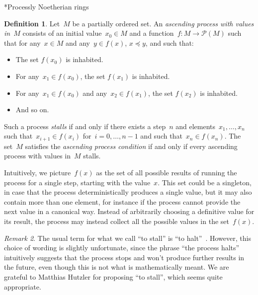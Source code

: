 \documentclass[10pt,reqno,a4paper]{amsbook}
\makeatletter
\theoremstyle{definition}
\newtheorem{defn}{Definition}[section]
\theoremstyle{plain}
\theoremstyle{remark}
\newtheorem{rem}[defn]{Remark}
\renewcommand{\P}{\mathcal{P}}
\newcommand{\?}{\,{:}\,}
\renewcommand{\_}{\mathpunct{.}\,}
\newcommand{\nocontentsline}[3]{}
\newcommand{\tocless}[1]{\let\addcontentsline=\nocontentsline}
\def\subsection{\@startsection{subsection}{2}%
  {0pt}{.5\linespacing\@plus.7\linespacing}{-.5em}%
  {\normalfont\bfseries}}
\makeatother
\begin{document}
{\tocless

\subsection*{Processly Noetherian rings}

\begin{defn}Let~$M$ be a partially ordered set. An \emph{ascending process
with values in~$M$} consists of an initial value~$x_0 \in M$ and a function~$f
: M \to \P(M)$ such that for any~$x \in M$ and any~$y \in f(x)$, $x \preceq y$,
and such that:
\begin{itemize}
\item The set $f(x_0)$ is inhabited.
\item For any~$x_1 \in f(x_0)$, the set $f(x_1)$ is inhabited.
\item For any~$x_1 \in f(x_0)$ and any~$x_2 \in f(x_1)$, the set $f(x_2)$ is inhabited.
\item And so on.
\end{itemize}
Such a process \emph{stalls} if and only if there
exists a step~$n$ and elements~$x_1, \ldots, x_n$ such that~$x_{i+1}
\in f(x_i)$ for~$i = 0,\ldots,n-1$ and such that~$x_n \in f(x_n)$.
The set~$M$ satisfies the \emph{ascending process condition} if and only if every
ascending process with values in~$M$ stalls.
\end{defn}

Intuitively, we picture~$f(x)$ as the set of all possible results of running
the process for a single step, starting with the value~$x$. This set could
be a singleton, in case that the process deterministically produces a single
value, but it may also contain more than one element, for instance if
the process cannot provide the next value in a canonical way. Instead of
arbitrarily choosing a definitive value for its result, the process may instead
collect all the possible values in the set~$f(x)$.

\begin{rem}The usual term for what we call ``to stall'' is
``to halt''~\cite{richman:noetherian,perdry-schuster:noetherian}. However, this
choice of wording is slightly unfortunate, since the phrase ``the process
halts'' intuitively suggests that the process stops and won't produce further
results in the future, even though this is not what is mathematically meant. We
are grateful to Matthias Hutzler for proposing ``to stall'', which seems quite
appropriate.
\end{rem}

}
\end{document}
